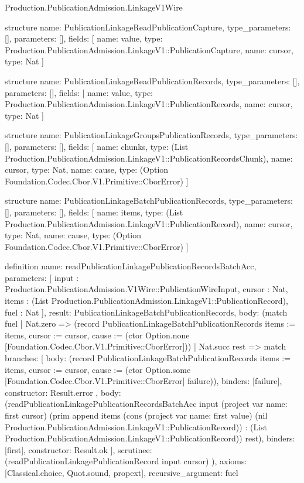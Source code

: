 \begin{lexlean}{Production.PublicationAdmission.LinkageV1Wire}
\begin{semanticmodule}
structure{
  name: PublicationLinkageReadPublicationCapture,
  type_parameters: [],
  parameters: [],
  fields: [
    {name: value, type: Production.PublicationAdmission.LinkageV1::PublicationCapture},
    {name: cursor, type: Nat}
  ]
}

structure{
  name: PublicationLinkageReadPublicationRecords,
  type_parameters: [],
  parameters: [],
  fields: [
    {name: value, type: Production.PublicationAdmission.LinkageV1::PublicationRecords},
    {name: cursor, type: Nat}
  ]
}

structure{
  name: PublicationLinkageGroupsPublicationRecords,
  type_parameters: [],
  parameters: [],
  fields: [
    {name: chunks, type: (List Production.PublicationAdmission.LinkageV1::PublicationRecordsChunk)},
    {name: cursor, type: Nat},
    {name: cause, type: (Option Foundation.Codec.Cbor.V1.Primitive::CborError)}
  ]
}

structure{
  name: PublicationLinkageBatchPublicationRecords,
  type_parameters: [],
  parameters: [],
  fields: [
    {name: items, type: (List Production.PublicationAdmission.LinkageV1::PublicationRecord)},
    {name: cursor, type: Nat},
    {name: cause, type: (Option Foundation.Codec.Cbor.V1.Primitive::CborError)}
  ]
}

definition{
  name: readPublicationLinkagePublicationRecordsBatchAcc,
  parameters: [
    input : Production.PublicationAdmission.V1Wire::PublicationWireInput,
    cursor : Nat,
    items : (List Production.PublicationAdmission.LinkageV1::PublicationRecord),
    fuel : Nat
  ],
  result: PublicationLinkageBatchPublicationRecords,
  body: (match fuel
    | Nat.zero => (record PublicationLinkageBatchPublicationRecords {items := items, cursor := cursor, cause := (ctor Option.none [Foundation.Codec.Cbor.V1.Primitive::CborError])})
    | Nat.succ rest => match{
      branches: [
        {
          body: (record PublicationLinkageBatchPublicationRecords {items := items, cursor := cursor, cause := (ctor Option.some [Foundation.Codec.Cbor.V1.Primitive::CborError] failure)}),
          binders: [failure],
          constructor: Result.error
        },
        {
          body: (readPublicationLinkagePublicationRecordsBatchAcc input (project var{
            name: first
          } cursor) (prim append items (cons (project var{
            name: first
          } value) (nil Production.PublicationAdmission.LinkageV1::PublicationRecord)) : (List Production.PublicationAdmission.LinkageV1::PublicationRecord)) rest),
          binders: [first],
          constructor: Result.ok
        }
      ],
      scrutinee: (readPublicationLinkagePublicationRecord input cursor)
    }),
  axioms: [Classical.choice, Quot.sound, propext],
  recursive_argument: fuel
}


\end{semanticmodule}
\end{lexlean}
